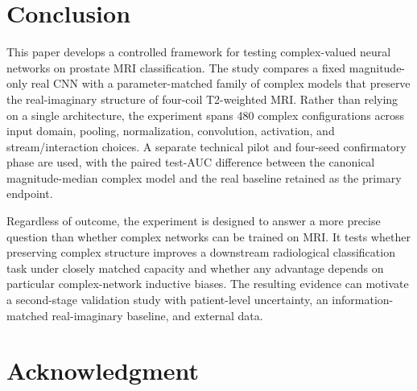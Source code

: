 \documentclass[journal]{IEEEtran}
\begin{document}
\section{Conclusion}\label{sec:conclusion}
This paper develops a controlled framework for testing complex-valued neural networks on prostate MRI classification. The study compares a fixed magnitude-only real CNN with a parameter-matched family of complex models that preserve the real-imaginary structure of four-coil T2-weighted MRI. Rather than relying on a single architecture, the experiment spans 480 complex configurations across input domain, pooling, normalization, convolution, activation, and stream/interaction choices. A separate technical pilot and four-seed confirmatory phase are used, with the paired test-AUC difference between the canonical magnitude-median complex model and the real baseline retained as the primary endpoint.


Regardless of outcome, the experiment is designed to answer a more precise question than whether complex networks can be trained on MRI. It tests whether preserving complex structure improves a downstream radiological classification task under closely matched capacity and whether any advantage depends on particular complex-network inductive biases. The resulting evidence can motivate a second-stage validation study with patient-level uncertainty, an information-matched real-imaginary baseline, and external data.

\section*{Acknowledgment}

\ifCLASSOPTIONcaptionsoff
  \newpage
\fi



\end{document}
